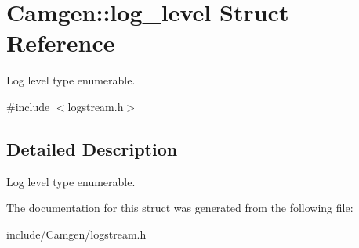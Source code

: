 \hypertarget{a00325}{\section{Camgen\-:\-:log\-\_\-level Struct Reference}
\label{a00325}
}


Log level type enumerable.  




{\ttfamily \#include $<$logstream.\-h$>$}



\subsection{Detailed Description}
Log level type enumerable. 

The documentation for this struct was generated from the following file\-:\begin{DoxyCompactItemize}
\item 
include/\-Camgen/logstream.\-h\end{DoxyCompactItemize}
